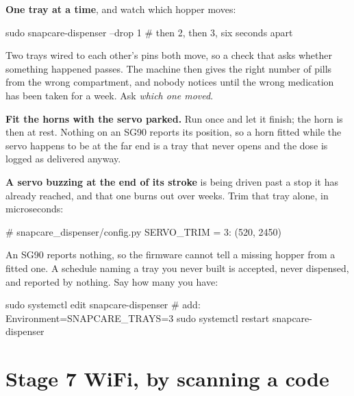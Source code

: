 \documentclass[11pt]{article}
\begin{document}
\begin{provebox}
\provetitle
\textbf{One tray at a time}, and watch which hopper moves:
\begin{shell}
sudo snapcare-dispenser --drop 1     # then 2, then 3, six seconds apart
\end{shell}
\end{provebox}

\begin{dangerbox}
Two trays wired to each other's pins both move, so a check that asks whether
something happened passes. The machine then gives the right number of pills from
the wrong compartment, and nobody notices until the wrong medication has been
taken for a week. Ask \emph{which one moved}.
\end{dangerbox}

\vspace{2mm}
\noindent\textbf{\sffamily Fit the horns with the servo parked.} Run
 once and let it finish; the horn is then at rest. Nothing on an
SG90 reports its position, so a horn fitted while the servo happens to be at the
far end is a tray that never opens \textemdash{} and the dose is logged as
delivered anyway.

\vspace{2mm}
\noindent\textbf{\sffamily A servo buzzing at the end of its stroke} is being
driven past a stop it has already reached, and that one burns out over weeks.
Trim that tray alone, in microseconds:

\begin{shell}
# snapcare_dispenser/config.py
SERVO_TRIM = {3: (520, 2450)}
\end{shell}

\vspace{1mm}
\begin{warnbox}
An SG90 reports nothing, so the firmware cannot tell a missing hopper from a
fitted one. A schedule naming a tray you never built is accepted, never
dispensed, and reported by nothing. Say how many you have:
\begin{shell}
sudo systemctl edit snapcare-dispenser    # add: Environment=SNAPCARE_TRAYS=3
sudo systemctl restart snapcare-dispenser
\end{shell}
\end{warnbox}

\section{Stage 7 \textemdash{} WiFi, by scanning a code}
\end{document}
